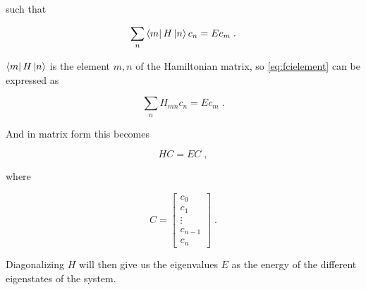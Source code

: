 such that

\begin{equation} \label{eq:fcielement}
   \sum_n \bra{m} H \ket{n} c_n  =  E c_m \; . 
\end{equation}

$\bra{m} H \ket{n}$ is the element $m, n$ of the Hamiltonian matrix, so \ref{eq:fcielement} can be expressed as

\begin{equation}
   \sum_n H_{mn} c_n  =  E c_m \; . 
\end{equation}

And in matrix form this becomes

\begin{equation}
    HC = EC \; ,
\end{equation}

where

$$C = \begin{bmatrix}
    c_0 \\
    c_1 \\
    \vdots \\
    c_{n-1} \\
    c_n
\end{bmatrix} \; .$$

Diagonalizing $H$ will then give us the eigenvalues $E$ as the energy of the different eigenstates of the system.
